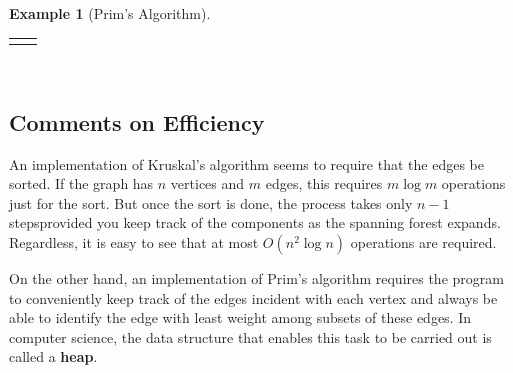 \documentclass[10pt,]{book}
\newcommand{\terminology}[1]{\textbf{#1}}
\theoremstyle{plain}
\theoremstyle{definition}
\theoremstyle{definition}
\theoremstyle{definition}
\newtheorem{example}[theorem]{Example}
\theoremstyle{definition}
\numberwithin{equation}{section}
\newlength{\panelmax}
\begin{document}
\begin{example}[Prim's Algorithm]
{%
\par\medskip\noindent
\hspace*{0.0125\linewidth}%
\begin{tabular}{@{}*{2}{c}@{}}
\begin{minipage}[c][\panelmax][t]{0.78\linewidth}\usebox{\panelboxAp}\end{minipage}&
\begin{minipage}[c][\panelmax][t]{0.17\linewidth}\usebox{\panelboxApre}\end{minipage}\end{tabular}\\
}%
\end{example}
\typeout{************************************************}
\typeout{************************************************}
\subsection[{Comments on Efficiency}]{Comments on Efficiency}\label{subsection-22}
\hypertarget{p-191}{}%
An implementation of Kruskal's algorithm seems to require that the edges be sorted. If the graph has \(n\) vertices and \(m\) edges, this requires \(m\log m\) operations just for the sort. But once the sort is done, the process takes only \(n-1\) steps\textemdash{}provided you keep track of the components as the spanning forest expands.  Regardless, it is easy to see that at most \(O(n^2\log n)\) operations are required.%
\par
\hypertarget{p-192}{}%
On the other hand, an implementation of Prim's algorithm requires the program to conveniently keep track of the edges incident with each vertex and always be able to identify the edge with least weight among subsets of these edges. In computer science, the data structure that enables this task to be carried out is called a \terminology{heap}.%
\typeout{************************************************}
\typeout{************************************************}
\end{document}
